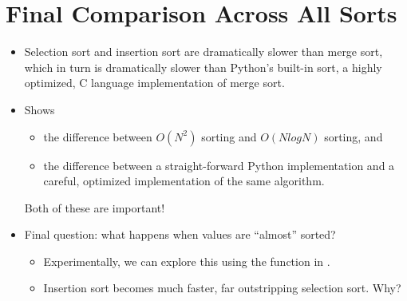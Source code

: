 \documentclass[letterpaper,10pt,english]{sphinxmanual}
\begin{document}
\section{Final Comparison Across All Sorts}
\label{\detokenize{lecture_notes/lec21_sorting:final-comparison-across-all-sorts}}\begin{itemize}
\item {} 
Selection sort and insertion sort are dramatically slower than merge
sort, which in turn is dramatically slower than Python’s built-in
sort, a highly optimized, C language implementation of merge sort.

\item {} 
Shows
\begin{itemize}
\item {} 
the difference between \(O(N^2)\) sorting and
\(O(N log N)\) sorting, and

\item {} 
the difference between a straight-forward Python implementation
and a careful, optimized implementation of the same algorithm.

\end{itemize}

Both of these are important!

\item {} 
Final question: what happens when values are “almost” sorted?
\begin{itemize}
\item {} 
Experimentally, we can explore this using the
 function in .

\item {} 
Insertion sort becomes much faster, far outstripping selection
sort. Why?

\end{itemize}

\end{itemize}
\end{document}
